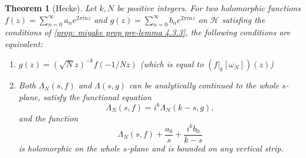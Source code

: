 \documentclass[10pt,leqno,twoside,b5paper]{article}
\theoremstyle{plain}
\newtheorem{theorem}[lem]{Theorem}
\theoremstyle{definition}
\numberwithin{equation}{section}
\numberwithin{lem}{section}
\begin{document}
\begin{theorem}[Hecke]\label{thm: miyake thm 4.3.6}
    Let $k,N$ be positive integers. For two holomorphic functions $f(z) = \sum_{n=0}^\infty a_ne^{2\pi i nz}$ and $g(z) = \sum_{n=0}^\infty b_ne^{2\pi i nz}$ on $\mathcal H$ satisfing the conditions of \cref{prop: miyake prop pre-lemma 4.3.3}, the following conditions are equivalent: 
    \begin{enumerate}[label = \textup{(\alph*)}]
        \item $g(z) = (\sqrt{N}z)^{-k}f(-1/Nz)$ \textup{(which is equal to $(f|_k[\omega_N])(z)$)}
        \item Both $\varLambda_N(s,f)$ and $\varLambda(s,g)$ can be analytically continued to the whole $s$-plane, satisfy the functional equation \[\varLambda_N(s,f) = i^k\varLambda_N(k-s,g),\] and the function \[\varLambda_N(s,f) + \frac{a_0}{s} + \frac{i^kb_0}{k-s}\] is holomorphic on the whole $s$-plane and is bounded on any vertical strip.
    \end{enumerate}
\end{theorem}
\end{document}
